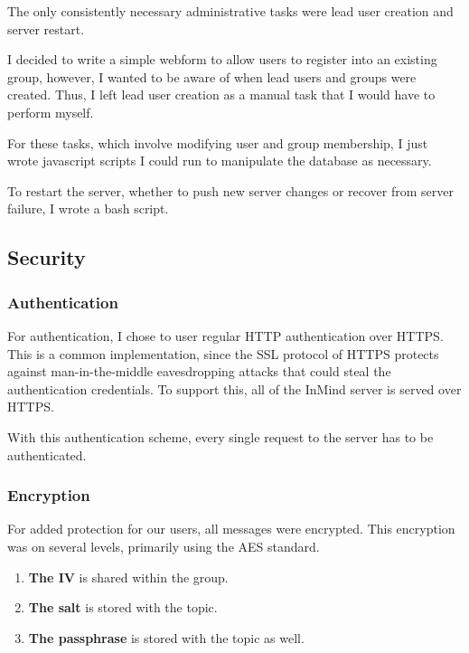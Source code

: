       The only consistently necessary administrative tasks were lead user creation
      and server restart.

      I decided to write a simple webform to allow users to register
      into an existing group,
      however, I wanted to be aware of when lead users and groups were created.
      Thus, I left lead user creation as a manual task that I would have to
      perform myself.

      For these tasks, which involve modifying user and group membership,
      I just wrote javascript scripts I could run to manipulate the database
      as necessary.

      To restart the server,
      whether to push new server changes or recover from server failure,
      I wrote a bash script.

    \subsection{Security}
      \subsubsection{Authentication}
        For authentication, I chose to user regular HTTP authentication over HTTPS.
        This is a common implementation, since the SSL protocol of HTTPS
        protects against man-in-the-middle
        eavesdropping attacks that could steal the authentication credentials.
        To support this, all of the InMind server is served over HTTPS.

        With this authentication scheme,
        every single request to the server has to be authenticated.

      \subsubsection{Encryption}
        For added protection for our users, all messages were encrypted.
        This encryption was on several levels, primarily using the AES standard.

        \begin{enumerate}
        \item \textbf{The IV} is shared within the group.
        \item \textbf{The salt} is stored with the topic.
        \item \textbf{The passphrase} is stored with the topic as well.
        \end{enumerate}

